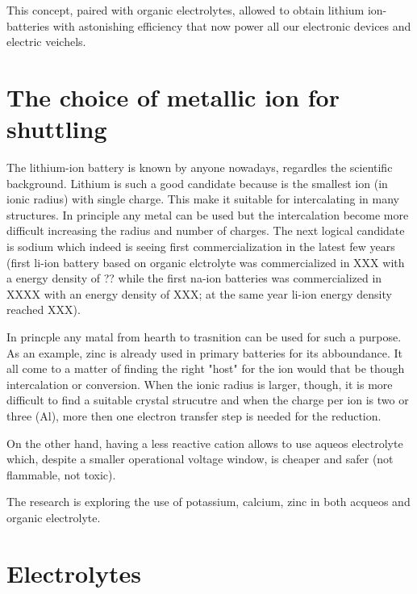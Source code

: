 This concept, paired with organic electrolytes, allowed to obtain lithium ion-batteries with astonishing efficiency that now power all our electronic devices and electric veichels.

\section{The choice of metallic ion for shuttling}

The lithium-ion battery is known by anyone nowadays, regardles the scientific background. Lithium is such a good candidate because is the smallest ion (in ionic radius) with single charge. This make it suitable for intercalating in many structures. In principle any metal can be used but the intercalation become more difficult increasing the radius and number of charges. The next logical candidate is sodium which indeed is seeing first commercialization in the latest few years (first li-ion battery based on organic elctrolyte was commercialized in XXX with a energy density of ?? while the first na-ion batteries was commercialized in XXXX with an energy density of XXX; at the same year li-ion energy density reached XXX). 

In princple any matal from hearth to trasnition can be used for such a purpose. As an example, zinc is already used in primary batteries for its abboundance. It all come to a matter of finding the right "host" for the ion would that be though intercalation or conversion. When the ionic radius is larger, though, it is more difficult to find a suitable crystal strucutre and when the charge per ion is two or three (Al), more then one electron transfer step is needed for the reduction. 

On the other hand, having a less reactive cation allows to use aqueos electrolyte which, despite a smaller operational voltage window, is cheaper and safer (not flammable, not toxic).

The research is exploring the use of potassium, calcium, zinc in both acqueos and organic electrolyte.

\section{Electrolytes}

